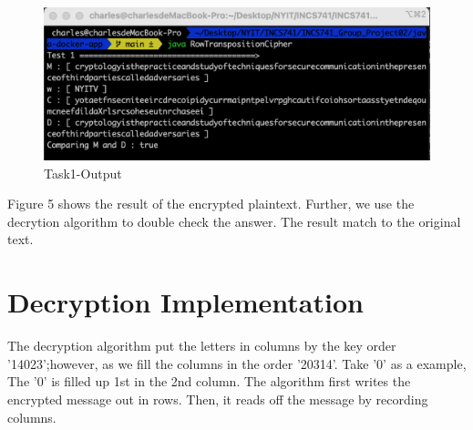 \documentclass[twoside,twocolumn]{article}
\begin{document}
\begin{figure}[H]
  \centering
  \includegraphics[scale=0.35]{./Graphs/Figure1.6.png}
  \caption{Task1-Output}
  \label{fig:testfig1}
\end{figure}

Figure 5 shows the result of the encrypted plaintext. Further, we use the decrytion algorithm to double check the answer. The result match to the original text.\\ 

\vspace*{-3.0cm}
\section{Decryption Implementation}

The decryption algorithm put the letters in columns by the key order '14023';however, as we fill the columns in the order '20314'. Take '0' as a example, The '0' is filled up 1st in the 2nd column. The algorithm first writes the encrypted message out in rows. Then, it reads off the message by recording columns. \\
\end{document}
